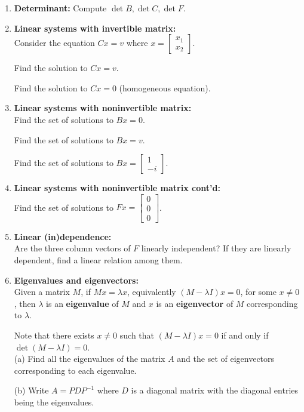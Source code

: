 \documentclass[12pt]{article}
\begin{document}
\begin{enumerate}
\item \textbf{Determinant:} Compute $\det B, \det C, \det F$.


\newpage
\item \textbf{Linear systems with invertible matrix:}\\
Consider the equation $Cx=v$ where $x =\left [ 
\begin{array}{c}
x_1 \\
x_2
\end{array}
\right].$
\vspace{1.5in}

Find the solution to $Cx=v$.
\vspace{4in}

Find the solution to $Cx=0$ (homogeneous equation). 
\newpage

\item \textbf{Linear systems with noninvertible matrix:}\\
Find the set of solutions to $Bx=0$.
\vspace{3in}

Find the set of solutions to $Bx=v$.
\vspace{2.5in}

Find the set of solutions to $Bx=\left [ 
\begin{array}{c}
1 \\
-i
\end{array}
\right].$

\newpage
\item \textbf{Linear systems with noninvertible matrix cont'd:}\\
Find the set of solutions to $Fx=\left [ 
\begin{array}{c}
0 \\
0\\
0
\end{array}
\right]$. 

\newpage
\item \textbf {Linear (in)dependence:}\\
Are the three column vectors of $F$ linearly independent?  If they are linearly dependent, find a linear relation among them.  

\newpage
\item \textbf{Eigenvalues and eigenvectors:}\\
Given a matrix $M$, if $Mx=\lambda x$, equivalently $(M-\lambda I)x=0$, for some $x\neq 0$, then $\lambda$ is an \textbf{eigenvalue} of $M$ and $x$ is an \textbf{eigenvector} of $M$ corresponding to $\lambda$.  

Note that  there exists $x\neq 0$ such that $(M-\lambda I)x=0$ if and only if $\det (M-\lambda I)=0$.  \\

(a) Find all the eigenvalues of the matrix $A$ and the set of eigenvectors corresponding to each eigenvalue.

(b) Write $A=PDP^{-1}$ where $D$ is a diagonal matrix with the diagonal entries being the eigenvalues.  



\end{enumerate}
\end{document}

